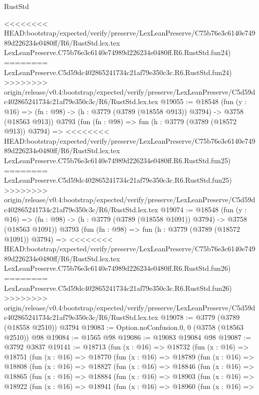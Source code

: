 \begin{lexlean}{RustStd}
\begin{coremodule}
{\begin{coremodule}
{{{{{{{{{{{{{{{{{{{{{{{{{{{{{{{<<<<<<<< HEAD:bootstrap/expected/verify/preserve/LexLeanPreserve/C75b76e3c6140e74989d226234e0480ff/R6/RustStd.lex.tex
    LexLeanPreserve.C75b76e3c6140e74989d226234e0480ff.R6.RustStd.fun24)
========
    LexLeanPreserve.C5d59dc402865241734c21af79e350c3c.R6.RustStd.fun24)
>>>>>>>> origin/release/v0.4:bootstrap/expected/verify/preserve/LexLeanPreserve/C5d59dc402865241734c21af79e350c3c/R6/RustStd.lex.tex
@19055 := @18548
    (fun (y : @16) => (fn : @98) -> (h : @3779 (@3789 (@18558 @913)) @3794) -> @3758 (@18563 @913))
    @3793
    (fun (fn : @98) =>
    fun (h : @3779 (@3789 (@18572 @913)) @3794) =>
<<<<<<<< HEAD:bootstrap/expected/verify/preserve/LexLeanPreserve/C75b76e3c6140e74989d226234e0480ff/R6/RustStd.lex.tex
    LexLeanPreserve.C75b76e3c6140e74989d226234e0480ff.R6.RustStd.fun25)
========
    LexLeanPreserve.C5d59dc402865241734c21af79e350c3c.R6.RustStd.fun25)
>>>>>>>> origin/release/v0.4:bootstrap/expected/verify/preserve/LexLeanPreserve/C5d59dc402865241734c21af79e350c3c/R6/RustStd.lex.tex
@19074 := @18548
    (fun (y : @16) =>
    (fn : @98) -> (h : @3779 (@3789 (@18558 @1091)) @3794) -> @3758 (@18563 @1091))
    @3793
    (fun (fn : @98) =>
    fun (h : @3779 (@3789 (@18572 @1091)) @3794) =>
<<<<<<<< HEAD:bootstrap/expected/verify/preserve/LexLeanPreserve/C75b76e3c6140e74989d226234e0480ff/R6/RustStd.lex.tex
    LexLeanPreserve.C75b76e3c6140e74989d226234e0480ff.R6.RustStd.fun26)
========
    LexLeanPreserve.C5d59dc402865241734c21af79e350c3c.R6.RustStd.fun26)
>>>>>>>> origin/release/v0.4:bootstrap/expected/verify/preserve/LexLeanPreserve/C5d59dc402865241734c21af79e350c3c/R6/RustStd.lex.tex
@19078 := @3779 (@3789 (@18558 @2510)) @3794
@19083 := Option.noConfusion.{0, 0} (@3758 (@18563 @2510)) @98
@19084 := @1565 @98
@19086 := @19083 @19084 @98
@19087 := @3792 @3837
@19141 := @18713
    (fun (x : @16) =>
    @18732
      (fun (x : @16) =>
      @18751
        (fun (x : @16) =>
        @18770
          (fun (x : @16) =>
          @18789
            (fun (x : @16) =>
            @18808
              (fun (x : @16) =>
              @18827
                (fun (x : @16) =>
                @18846
                  (fun (x : @16) =>
                  @18865
                    (fun (x : @16) =>
                    @18884
                      (fun (x : @16) =>
                      @18903
                        (fun (x : @16) =>
                        @18922
                          (fun (x : @16) =>
                          @18941
                            (fun (x : @16) =>
                            @18960
                              (fun (x : @16) =>
}}}}}}}}}}}}}}}}}}}}}}}}}}}}}}}
\end{coremodule}}
\end{coremodule}
\end{lexlean}
